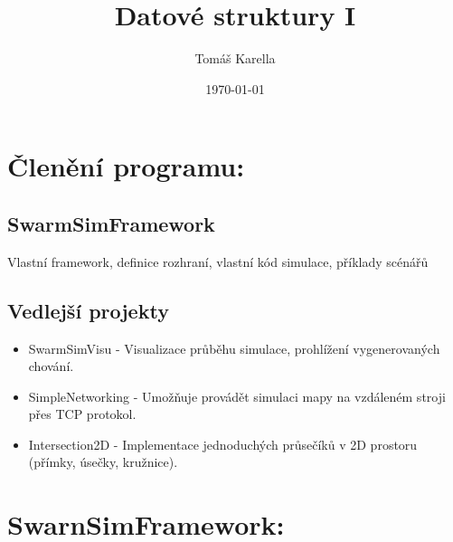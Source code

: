 \documentclass[12pt, oneside]{article}
\title{Datové struktury I}
\author{Tomáš Karella}
\date{\today}
\begin{document}
	\maketitle

\section{Členění programu:}
\subsection{SwarmSimFramework} 
Vlastní framework, definice rozhraní, vlastní kód simulace, příklady scénářů
\subsection{Vedlejší projekty}
\begin{itemize}
\item SwarmSimVisu - 
Visualizace průběhu simulace, prohlížení vygenerovaných chování. 
\item SimpleNetworking -
Umožňuje provádět simulaci mapy na vzdáleném stroji přes TCP protokol.
\item Intersection2D - 
Implementace jednoduchých průsečíků v 2D prostoru (přímky, úsečky, kružnice).
\end{itemize}
\newpage
\section{SwarnSimFramework:}
\end{document}
